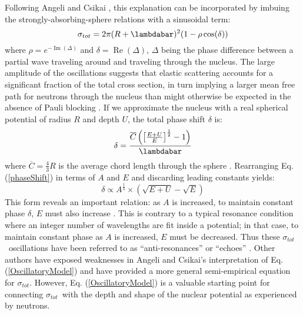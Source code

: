 \documentclass[twocolumn,secnumarabic,amssymb, nobibnotes, aps, prl,
superscriptaddress, nobalancelastpage, floatfix]{revtex4}
\newcommand{\tot}{\ensuremath{\sigma_{tot}}}
\begin{document}
Following Angeli and Csikai \cite{Angeli1970}, this explanation can be
incorporated by imbuing the strongly-absorbing-sphere relations
with a sinusoidal term:
\begin{equation} \label{OscillatoryModel}
    \tot = 2\pi (R+\lambdabar)^{2}(1 - \rho \cos(\delta))
\end{equation}
where $\rho = e^{-\operatorname{Im}(\Delta)}$ and $\delta =
\operatorname{Re}(\Delta)$, $\Delta$ being the phase difference between a
partial wave traveling
around and traveling through the nucleus. The large amplitude of the
oscillations suggests that elastic scattering accounts for a
significant fraction of the total cross section, in turn implying a 
larger mean free path for neutrons through the nucleus 
than might otherwise be expected in the absence of Pauli blocking
\cite{Mohr1955, Feshbach1958}.
If we approximate the nucleus with a
real spherical potential of radius $R$ and depth $U$, the total phase shift $\delta$ is:
\begin{equation} \label{phaseShift}
    \delta =
    \frac{\overline{C}\left(\left[{\frac{E+U}{E}}\right]^{\frac{1}{2}}-1\right)}{\lambdabar}
\end{equation}
where $\overline{C} = \frac{4}{3}R$ is the average chord length through the
sphere \cite{Angeli1970}. Rearranging Eq. (\ref{phaseShift}) in terms of $A$ and $E$ and
discarding leading constants yields:
\begin{equation}
    \delta \propto A^{\frac{1}{3}}\times\left(\sqrt{E+U}-\sqrt{E}\right)
\end{equation}
This form reveals an important relation: as $A$ is increased, to maintain constant 
phase $\delta$, $E$ must also increase \cite{Satchler1980, Peterson1962}. 
This is contrary to a typical resonance condition where an integer number of wavelengths
are fit inside a potential; in that case, to maintain constant phase as $A$ is increased,
$E$ must be decreased. Thus these \tot\ oscillations have been referred to as
``anti-resonances'' or ``echoes'' \cite{Satchler1980, McVoy1967}.
Other authors \cite{Ahmad1973} have
exposed weaknesses in Angeli and Csikai's interpretation of
Eq. (\ref{OscillatoryModel}) and have provided a more general semi-empirical
equation for \tot. However, Eq. (\ref{OscillatoryModel}) is a valuable starting
point for connecting \tot\ with the depth and shape of the nuclear
potential as experienced by neutrons.
\end{document}
